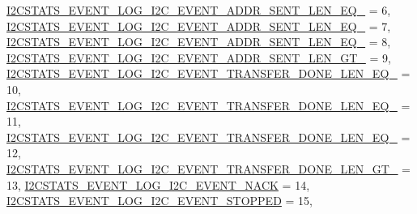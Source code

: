 \begin{DoxyCompactItemize}
\hyperlink{group___i2_c_stats_ggae803cac254ef7e0b2d08ebcc3578241aa540fe1acb345d50f2650308d32ed7d21}{\-I2\-C\-S\-T\-A\-T\-S\-\_\-\-E\-V\-E\-N\-T\-\_\-\-L\-O\-G\-\_\-\-I2\-C\-\_\-\-E\-V\-E\-N\-T\-\_\-\-A\-D\-D\-R\-\_\-\-S\-E\-N\-T\-\_\-\-L\-E\-N\-\_\-\-E\-Q\-\_} = 6, 
\hyperlink{group___i2_c_stats_ggae803cac254ef7e0b2d08ebcc3578241aa7d164a0d8a6ab4d82621d87c576a2785}{\-I2\-C\-S\-T\-A\-T\-S\-\_\-\-E\-V\-E\-N\-T\-\_\-\-L\-O\-G\-\_\-\-I2\-C\-\_\-\-E\-V\-E\-N\-T\-\_\-\-A\-D\-D\-R\-\_\-\-S\-E\-N\-T\-\_\-\-L\-E\-N\-\_\-\-E\-Q\-\_} = 7, 
\*
\hyperlink{group___i2_c_stats_ggae803cac254ef7e0b2d08ebcc3578241aa94eef6dcc70321a4fa552278db1da3b1}{\-I2\-C\-S\-T\-A\-T\-S\-\_\-\-E\-V\-E\-N\-T\-\_\-\-L\-O\-G\-\_\-\-I2\-C\-\_\-\-E\-V\-E\-N\-T\-\_\-\-A\-D\-D\-R\-\_\-\-S\-E\-N\-T\-\_\-\-L\-E\-N\-\_\-\-E\-Q\-\_} = 8, 
\hyperlink{group___i2_c_stats_ggae803cac254ef7e0b2d08ebcc3578241aa029fe50b95f226e284c43002ec517161}{\-I2\-C\-S\-T\-A\-T\-S\-\_\-\-E\-V\-E\-N\-T\-\_\-\-L\-O\-G\-\_\-\-I2\-C\-\_\-\-E\-V\-E\-N\-T\-\_\-\-A\-D\-D\-R\-\_\-\-S\-E\-N\-T\-\_\-\-L\-E\-N\-\_\-\-G\-T\-\_} = 9, 
\hyperlink{group___i2_c_stats_ggae803cac254ef7e0b2d08ebcc3578241aad5906630488883d90bb58dcef3f1c1b8}{\-I2\-C\-S\-T\-A\-T\-S\-\_\-\-E\-V\-E\-N\-T\-\_\-\-L\-O\-G\-\_\-\-I2\-C\-\_\-\-E\-V\-E\-N\-T\-\_\-\-T\-R\-A\-N\-S\-F\-E\-R\-\_\-\-D\-O\-N\-E\-\_\-\-L\-E\-N\-\_\-\-E\-Q\-\_} = 10, 
\hyperlink{group___i2_c_stats_ggae803cac254ef7e0b2d08ebcc3578241aa5deeda122b6fd9e00d9e4e80cad04b37}{\-I2\-C\-S\-T\-A\-T\-S\-\_\-\-E\-V\-E\-N\-T\-\_\-\-L\-O\-G\-\_\-\-I2\-C\-\_\-\-E\-V\-E\-N\-T\-\_\-\-T\-R\-A\-N\-S\-F\-E\-R\-\_\-\-D\-O\-N\-E\-\_\-\-L\-E\-N\-\_\-\-E\-Q\-\_} = 11, 
\*
\hyperlink{group___i2_c_stats_ggae803cac254ef7e0b2d08ebcc3578241aa71196aa4a2d8ae55bf92f52820777365}{\-I2\-C\-S\-T\-A\-T\-S\-\_\-\-E\-V\-E\-N\-T\-\_\-\-L\-O\-G\-\_\-\-I2\-C\-\_\-\-E\-V\-E\-N\-T\-\_\-\-T\-R\-A\-N\-S\-F\-E\-R\-\_\-\-D\-O\-N\-E\-\_\-\-L\-E\-N\-\_\-\-E\-Q\-\_} = 12, 
\hyperlink{group___i2_c_stats_ggae803cac254ef7e0b2d08ebcc3578241aa6a7b8d49f207fe8a70010ff8c160ada9}{\-I2\-C\-S\-T\-A\-T\-S\-\_\-\-E\-V\-E\-N\-T\-\_\-\-L\-O\-G\-\_\-\-I2\-C\-\_\-\-E\-V\-E\-N\-T\-\_\-\-T\-R\-A\-N\-S\-F\-E\-R\-\_\-\-D\-O\-N\-E\-\_\-\-L\-E\-N\-\_\-\-G\-T\-\_} = 13, 
\hyperlink{group___i2_c_stats_ggae803cac254ef7e0b2d08ebcc3578241aad3d598423961fabb425f3481522fc478}{\-I2\-C\-S\-T\-A\-T\-S\-\_\-\-E\-V\-E\-N\-T\-\_\-\-L\-O\-G\-\_\-\-I2\-C\-\_\-\-E\-V\-E\-N\-T\-\_\-\-N\-A\-C\-K} = 14, 
\hyperlink{group___i2_c_stats_ggae803cac254ef7e0b2d08ebcc3578241aa11bfe5267d23dba2632ef97185485a0c}{\-I2\-C\-S\-T\-A\-T\-S\-\_\-\-E\-V\-E\-N\-T\-\_\-\-L\-O\-G\-\_\-\-I2\-C\-\_\-\-E\-V\-E\-N\-T\-\_\-\-S\-T\-O\-P\-P\-E\-D} = 15, 

\end{DoxyCompactItemize}

